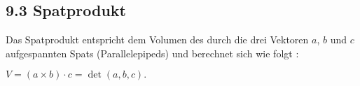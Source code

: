 \subsection{9.3 Spatprodukt}{
\vskip1pt

Das Spatprodukt entspricht dem Volumen des durch die drei Vektoren $a$, $b$ und $c$ aufgespannten Spats (Parallelepipeds) und berechnet sich wie folgt :\par \vskip7pt

\begin{center}
$V = (a \times b) \cdot c = \det \left(a, b, c\right).$
\end{center}\vspace{-3pt}

}
